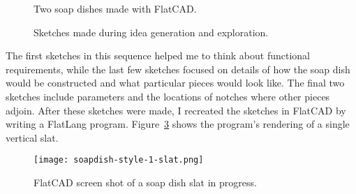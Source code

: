 \documentclass[times, 10pt, twocolumn]{article}
\begin{document}
\begin{figure}
  \centering
  \hspace{0.5cm}
  \caption{Two soap dishes made with FlatCAD.}
  \label{fig:soapdish}
\end{figure}

\begin{figure}
  \centering
  \caption{Sketches made during idea generation and exploration.}
  \label{fig:soapdish-sketch}
\end{figure}

The first sketches in this sequence helped me to think about
functional requirements, while the last few sketches focused on
details of how the soap dish would be constructed and what particular
pieces would look like. The final two sketches include parameters and
the locations of notches where other pieces adjoin. After these
sketches were made, I recreated the sketches in FlatCAD by writing a
FlatLang program. Figure~\ref{fig:soapdish-slat} shows the program's
rendering of a single vertical slat.

\begin{figure}
   \centering
   \texttt{[image: soapdish-style-1-slat.png]} 
   \caption{FlatCAD screen shot of a soap dish slat in progress.}
   \label{fig:soapdish-slat}
\end{figure}
\end{document}
